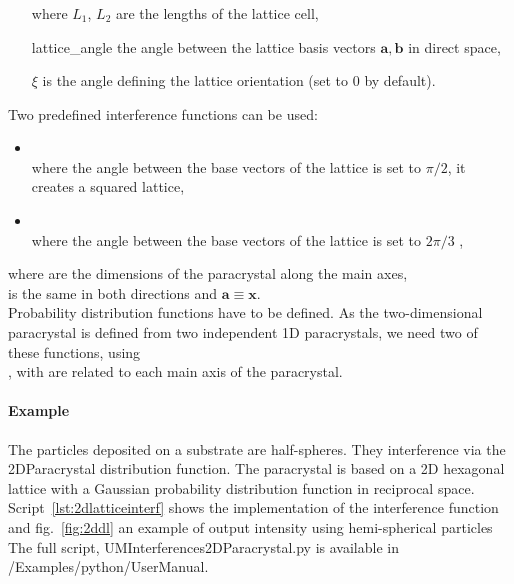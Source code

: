 \subsubsection{ } \label{paragraph2dpara}
\begin{itemize}
\item[where] $L_1$, $L_2$ are the lengths of the lattice cell,
\item[] lattice\_angle the angle between the lattice basis vectors $\mathbf{a}, \mathbf{b}$ in direct space,
\item[] $\xi$ is the angle defining the lattice orientation (set to $0$ by default).
\end{itemize}
Two predefined interference functions can be used:
\begin{itemize}
\item  {}\\
where the angle between the base vectors of the lattice is set to $\pi/2$,
it creates a squared lattice,
\item {}\\
where the angle between the base vectors of the lattice is set to $2\pi/3$ ,
\end{itemize}
where
 are the dimensions of the paracrystal along the main axes,\\  is the same in both directions and $\mathbf{a}\equiv \mathbf{x}$.\\

Probability distribution functions have to be defined. As the two-dimensional paracrystal is defined from two independent 1D paracrystals, we need two of these functions, using\\ , with  are related to each main axis of the paracrystal.


\paragraph{Example} The particles deposited on a substrate are half-spheres. They interference via the 2DParacrystal distribution function. The paracrystal is based on a 2D hexagonal lattice with a Gaussian probability distribution function in reciprocal space.  Script~\ref{lst:2dlatticeinterf} shows the implementation of the interference function and fig.~\ref{fig:2ddl} an example of output intensity using hemi-spherical particles The full script, UMInterferences2DParacrystal.py is available in /Examples/python/UserManual.

